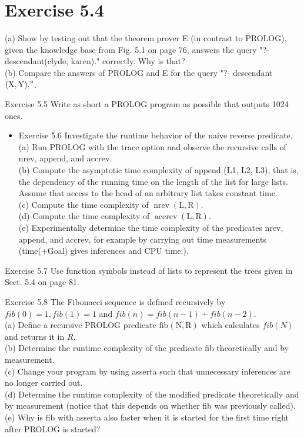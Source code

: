 \documentclass[10pt]{book}
\begin{document}
\section*{Exercise 5.4}
(a) Show by testing out that the theorem prover E (in contrast to PROLOG), given the knowledge base from Fig. 5.1 on page 76, answers the query "?- descendant(clyde, karen)." correctly. Why is that?\\
(b) Compare the answers of PROLOG and E for the query "?- descendant $(\mathrm{X}, \mathrm{Y}) . "$.

Exercise 5.5 Write as short a PROLOG program as possible that outputs 1024 ones.

\begin{itemize}
  \item Exercise 5.6 Investigate the runtime behavior of the naive reverse predicate.\\

(a) Run PROLOG with the trace option and observe the recursive calls of nrev, append, and accrev.\\
(b) Compute the asymptotic time complexity of append (L1, L2, L3), that is, the dependency of the running time on the length of the list for large lists. Assume that access to the head of an arbitrary list takes constant time.\\
(c) Compute the time complexity of $\operatorname{nrev}(\mathrm{L}, \mathrm{R})$.\\
(d) Compute the time complexity of $\operatorname{accrev}(\mathrm{L}, \mathrm{R})$.\\
(e) Experimentally determine the time complexity of the predicates nrev, append, and accrev, for example by carrying out time measurements (time(+Goal) gives inferences and CPU time.).
\end{itemize}

Exercise 5.7 Use function symbols instead of lists to represent the trees given in Sect. 5.4 on page 81.

Exercise 5.8 The Fibonacci sequence is defined recursively by $f i b(0)=1, f i b(1)=1$ and $f i b(n)=f i b(n-1)+f i b(n-2)$.\\
(a) Define a recursive PROLOG predicate $\mathrm{fib}(\mathrm{N}, \mathrm{R})$ which calculates $f i b(N)$ and returns it in $R$.\\
(b) Determine the runtime complexity of the predicate fib theoretically and by measurement.\\
(c) Change your program by using asserta such that unnecessary inferences are no longer carried out.\\
(d) Determine the runtime complexity of the modified predicate theoretically and by measurement (notice that this depends on whether fib was previously called).\\
(e) Why is fib with asserta also faster when it is started for the first time right after PROLOG is started?
\end{document}
